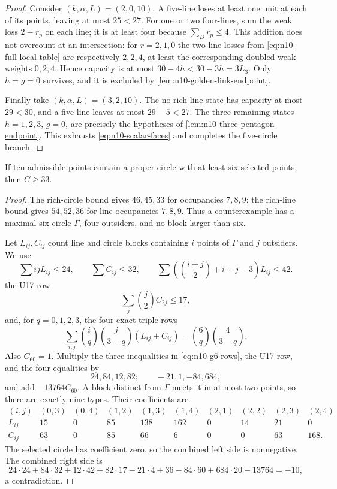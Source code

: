 \begin{proof}
Consider $(k,\alpha,L)=(2,0,10)$.  A five-line loses at least one unit at
each of its points, leaving at most $25<27$.  For one or two four-lines,
sum the weak loss $2-r_p$ on each line; it is at least four because
$\sum_Dr_p\le4$.  This addition does not overcount at an intersection:
for $r=2,1,0$ the two-line losses from
\eqref{eq:n10-full-local-table} are respectively $2,2,4$, at least the
corresponding doubled weak weights $0,2,4$.  Hence capacity is at most
$30-4h<30-3h=3L_3$.  Only $h=g=0$ survives, and it is excluded by
\cref{lem:n10-golden-link-endpoint}.

Finally take $(k,\alpha,L)=(3,2,10)$.  The no-rich-line state has capacity
at most $29<30$, and a five-line leaves at most $29-5<27$.  The three
remaining states $h=1,2,3$, $g=0$, are precisely the hypotheses of
\cref{lem:n10-three-pentagon-endpoint}.  This exhausts
\eqref{eq:n10-scalar-faces} and completes the five-circle branch.
\end{proof}

\begin{lemma}
\label{lem:n10-gamma6}
If ten admissible points contain a proper circle with at least six selected
points, then $C\ge33$.
\end{lemma}

\begin{proof}
The rich-circle bound gives $46,45,33$ for occupancies $7,8,9$; the
rich-line bound gives $54,52,36$ for line occupancies $7,8,9$.  Thus a
counterexample has a maximal six-circle $\Gamma$, four outsiders, and no
block larger than six.

Let $L_{ij},C_{ij}$ count line and circle blocks containing $i$ points of
$\Gamma$ and $j$ outsiders.  We use
\begin{equation}
 \sum ijL_{ij}\le24,\qquad \sum C_{ij}\le32,\qquad
 \sum\left(\binom{i+j}{2}+i+j-3\right)L_{ij}\le42.\label{eq:n10-g6-rows}
\end{equation}
the U17 row
\[
 \sum_j\binom j2C_{2j}\le17,
\]
and, for $q=0,1,2,3$, the four exact triple rows
\[
 \sum_{i,j}\binom iq\binom j{3-q}(L_{ij}+C_{ij})
 =\binom6q\binom4{3-q}.
\]
Also $C_{60}=1$.  Multiply the three inequalities in
\eqref{eq:n10-g6-rows}, the U17 row, and the four equalities by
\[
 24,84,12,82;\qquad -21,1,-84,684,
\]
and add $-13764C_{60}$.  A block distinct from $\Gamma$ meets it in at most
two points, so there are exactly nine types.  Their coefficients are
\[
\begin{array}{c|rrrrrrrrr}
(i,j)&(0,3)&(0,4)&(1,2)&(1,3)&(1,4)&(2,1)&(2,2)&(2,3)&(2,4)\\ \hline
L_{ij}&15&0&85&138&162&0&14&21&0\\
C_{ij}&63&0&85&66&6&0&0&63&168.
\end{array}
\]
The selected circle has coefficient zero, so the combined left side is
nonnegative.  The combined right side is
\[
24\cdot24+84\cdot32+12\cdot42+82\cdot17
-21\cdot4+36-84\cdot60+684\cdot20-13764=-10,
\]
a contradiction.
\end{proof}

